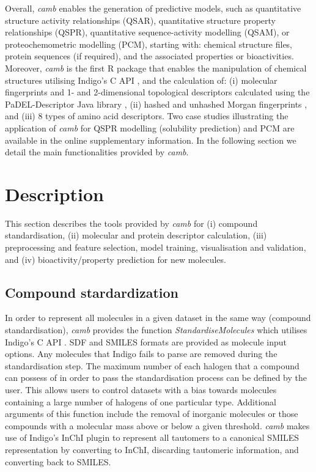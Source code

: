 \documentclass{bioinfo}
\begin{document}
Overall, {\it camb} enables the generation of predictive  models,
such as quantitative structure activity relationships (QSAR), 
quantitative structure property relationships (QSPR), 
quantitative sequence-activity modelling (QSAM), 
or proteochemometric modelling (PCM),
starting with: chemical structure files, protein sequences (if required), and the associated properties or bioactivities.
Moreover, {\it camb} is the first R package that enables the manipulation of chemical structures utilising Indigo's C API \citep{Indigo},
and the calculation of:
(i) molecular fingerprints and 1- and 2-dimensional topological descriptors calculated using the PaDEL-Descriptor Java library \citep{padel},
(ii) hashed and unhashed Morgan fingerprints \citep{extended_fp},
and (iii) 8 types of amino acid descriptors. 
Two case studies illustrating the application of {\it camb} for
QSPR modelling (solubility prediction) and PCM are available in the online supplementary information.
In the following section we detail the main functionalities provided by {\it camb}. 

\section{Description}
This section describes the tools provided by {\it camb} 
for (i) compound standardisation, (ii) molecular and protein descriptor calculation, 
(iii) preprocessing and feature selection, model training, visualisation and validation, and (iv) bioactivity/property prediction for new molecules.	

\subsection{Compound stardardization}

In order to represent all molecules in a given dataset in the same 
way (compound standardisation),
{\it camb}  provides the function {\it StandardiseMolecules} which utilises Indigo's C API \citep{Indigo}.
SDF and SMILES formats are provided as molecule input options. Any molecules that Indigo fails to parse are removed during the standardisation step.
The maximum number of each halogen that a compound can possess of in order to pass the standardisation process can be defined by the user. This allows users to control datasets with a bias towards molecules containing a large number of halogens of one particular type.
Additional arguments of this function include the removal of inorganic molecules
or those compounds with a molecular mass above or below a given threshold.
{\it camb} makes use of Indigo's InChI \citep{inchi} plugin to represent all tautomers to a canonical SMILES representation
by converting to InChI, discarding tautomeric information, and converting back to SMILES.  
\end{document}
